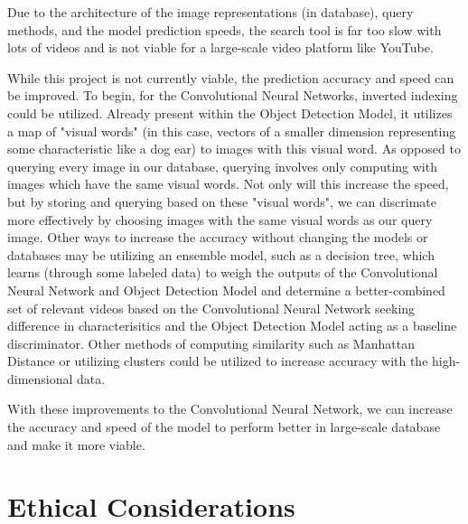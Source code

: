 \documentclass[10pt,twocolumn]{article}
\begin{document}
Due to the architecture of the image representations (in database), query methods, and the model prediction speeds, the search tool is far too slow with lots of videos and is not viable for a large-scale video platform like YouTube.

While this project is not currently viable, the prediction accuracy and speed can be improved. To begin, for the Convolutional Neural Networks, inverted indexing could be utilized. Already present within the Object Detection Model, it utilizes a map of "visual words" (in this case, vectors of a smaller dimension representing some characteristic like a dog ear) to images with this visual word. As opposed to querying every image in our database, querying involves only computing with images which have the same visual words. Not only will this increase the speed, but by storing and querying based on these "visual words", we can discrimate more effectively by choosing images with the same visual words as our query image. Other ways to increase the accuracy without changing the models or databases may be utilizing an ensemble model, such as a decision tree, which learns (through some labeled data) to weigh the outputs of the Convolutional Neural Network and Object Detection Model and determine a better-combined set of relevant videos based on the Convolutional Neural Network seeking difference in characterisitics and the Object Detection Model acting as a baseline discriminator. Other methods of computing similarity such as Manhattan Distance or utilizing clusters could be utilized to increase accuracy with the high-dimensional data.

With these improvements to the Convolutional Neural Network, we can increase the accuracy and speed of the model to perform better in large-scale database and make it more viable.

\section {Ethical Considerations}


\end{document}
